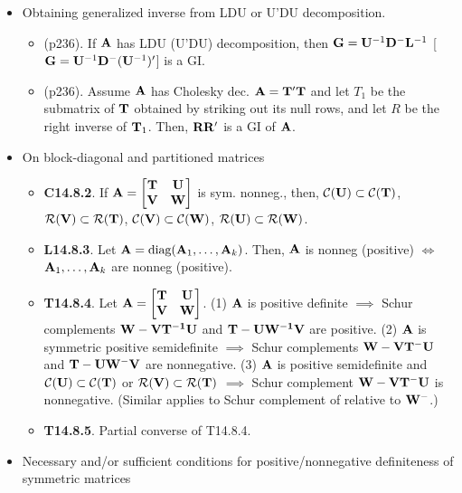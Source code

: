 \documentclass[a4paper, oneside]{book}
\begin{document}
\begin{itemize}
\item Obtaining generalized inverse from LDU or U'DU decomposition.
	\begin{itemize}
	\item (p236). If $\mathbf{A}$ has LDU (U'DU) decomposition, then $\mathbf G=\mathbf{U}^{-1}\mathbf{D}^{-}\mathbf{L}^{-1}$ [$\mathbf G=\mathbf{U}^{-1}\mathbf{D}^{-}(\mathbf{U}^{-1})'$] is a GI.
	\item (p236). Assume $\mathbf A$ has Cholesky dec. $\mathbf{A=T'T}$ and let $T_1$ be the submatrix of $\mathbf{T}$ obtained by striking out its null rows, and let $R$ be the right inverse of $\mathbf T_1$. Then, $\mathbf{RR'}$ is a GI of $\mathbf{A}$.
	\end{itemize}
\item On block-diagonal and partitioned matrices
	\begin{itemize}
	\item \textbf{C14.8.2}. If $\mathbf{A}=\begin{bmatrix}
\mathbf{T} & \mathbf U \\ \mathbf V & \mathbf W
\end{bmatrix}$ is sym. nonneg., then, $\mathcal{C}(\mathbf U) \subset \mathcal{C}(\mathbf{T})$, $\mathcal{R}(\mathbf V) \subset \mathcal{R}(\mathbf{T})$, $\mathcal{C}(\mathbf V) \subset \mathcal{C}(\mathbf{W})$, $\mathcal{R}(\mathbf U) \subset \mathcal{R}(\mathbf{W})$.
	\item \textbf{L14.8.3}. Let $\mathbf{A}=\text{diag}(\mathbf{A}_1, \hdots, \mathbf{A}_k)$. Then, $\mathbf{A}$ is nonneg (positive) $\iff$ $\mathbf{A}_1,\hdots,\mathbf{A}_k$ are nonneg (positive). 
	\item \textbf{T14.8.4}. Let $\mathbf{A}=\begin{bmatrix}
\mathbf{T} & \mathbf U \\ \mathbf V & \mathbf W
\end{bmatrix}$. (1) $\mathbf{A}$ is positive definite $\implies$ Schur complements $\mathbf{W-V\mathbf{T}^{-1}\mathbf{U}}$ and $\mathbf{T-U\mathbf{W}^{-1}\mathbf{V}}$ are positive. (2) $\mathbf{A}$ is symmetric positive semidefinite $\implies$ Schur complements $\mathbf{W-V\mathbf{T}^{-}\mathbf{U}}$ and $\mathbf{T-U\mathbf{W}^{-}\mathbf{V}}$ are nonnegative. (3) $\mathbf{A}$ is positive semidefinite and $\mathcal{C}(\mathbf U) \subset \mathcal{C}(\mathbf{T})$ or $\mathcal{R}(\mathbf V) \subset \mathcal{R}(\mathbf{T})$ $\implies$ Schur complement $\mathbf{W-V\mathbf{T}^{-}\mathbf{U}}$ is nonnegative. (Similar applies to Schur complement of relative to $\mathbf{W}^-$.)
	\item \textbf{T14.8.5}. Partial converse of T14.8.4.
	\end{itemize}
\item Necessary and/or sufficient conditions for positive/nonnegative definiteness of symmetric matrices

\end{itemize}
\end{document}

